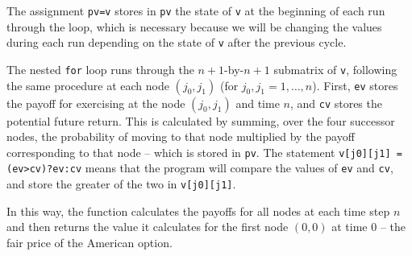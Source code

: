 \documentclass[12pt,a4paper]{article}
\begin{document}
The assignment \texttt{pv=v} stores in \texttt{pv} the state of \texttt{v} at the beginning of each run through the loop, which is necessary because we will be changing the values during each run depending on the state of \texttt{v} after the previous cycle.

The nested \texttt{for} loop runs through the $n+1$-by-$n+1$ submatrix of \texttt{v}, following the same procedure at each node $(j_0,j_1)$ (for $j_0,j_1=1,\dots,n$). First, \texttt{ev} stores the payoff for exercising at the node $(j_0,j_1)$ and time $n$, and \texttt{cv} stores the potential future return. This is calculated by summing, over the four successor nodes, the probability of moving to that node multiplied by the payoff corresponding to that node -- which is stored in \texttt{pv}.
The statement \texttt{v[j0][j1] = (ev>cv)?ev:cv} means that the program will compare the values of \texttt{ev} and \texttt{cv}, and store the greater of the two in \texttt{v[j0][j1]}.

In this way, the function calculates the payoffs for all nodes at each time step $n$ and then returns the value it calculates for the first node $(0,0)$ at time $0$ -- the fair price of the American option.
\end{document}
